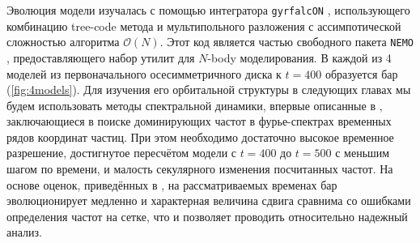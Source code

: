 \documentclass{trlnotes}
\begin{document}
Эволюция модели изучалась с помощью интегратора \texttt{gyrfalcON} \cite{dehnen2002}, использующего комбинацию
tree-code метода и мультипольного разложения с ассимпотической сложностью алгоритма $\mathcal O(N)$. Этот код 
является частью свободного пакета \texttt{NEMO} \citep{teuben1995a}, предоставляющего набор утилит для $N$-body 
моделирования. В каждой из 4 моделей из первоначального осесимметричного диска к $t=400$ образуется бар 
(\ref{fig:4models}). Для изучения его орбитальной структуры в следующих главах мы будем использовать методы 
спектральной динамики, впервые описанные в \citet{binney1982}, заключающиеся в поиске доминирующих частот в 
фурье-спектрах временных рядов координат частиц. При этом необходимо достаточно высокое временное разрешение, 
достигнутое пересчётом модели с $t=400$ до $t=500$ с меньшим шагом по времени, и малость секулярного изменения посчитанных частот. На основе оценок, приведённых в \cite{parul2020}, на 
рассматриваемых временах бар эволюционирует медленно и характерная величина сдвига сравнима со ошибками 
определения частот на сетке, что и позволяет проводить 
относительно надежный анализ.
\end{document}
